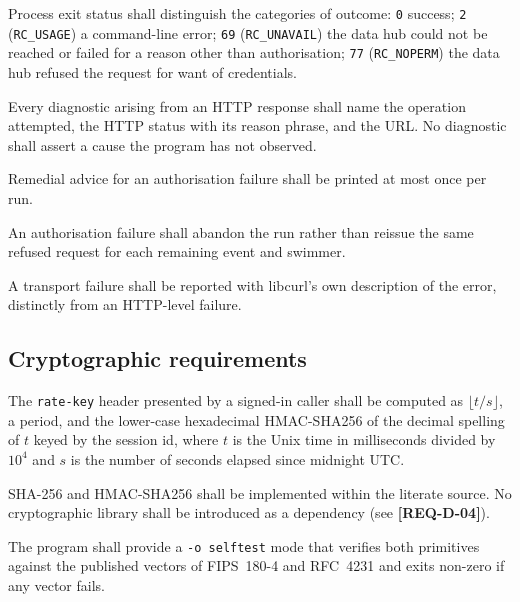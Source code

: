 \documentclass[12pt]{article}
\newcommand{\code}[1]{\texttt{#1}}
\newcommand{\req}[1]{\textbf{[#1]}}
\begin{document}
\begin{description}[style=nextline]
  \item[\req{REQ-E-01}] Process exit status shall distinguish the
        categories of outcome: \code{0} success; \code{2}
        (\code{RC\_USAGE}) a command-line error; \code{69}
        (\code{RC\_UNAVAIL}) the data hub could not be reached or
        failed for a reason other than authorisation; \code{77}
        (\code{RC\_NOPERM}) the data hub refused the request for want
        of credentials.
  \item[\req{REQ-E-02}] Every diagnostic arising from an HTTP response
        shall name the operation attempted, the HTTP status with its
        reason phrase, and the URL.  No diagnostic shall assert a cause
        the program has not observed.
  \item[\req{REQ-E-03}] Remedial advice for an authorisation failure
        shall be printed at most once per run.
  \item[\req{REQ-E-04}] An authorisation failure shall abandon the run
        rather than reissue the same refused request for each remaining
        event and swimmer.
  \item[\req{REQ-E-05}] A transport failure shall be reported with
        libcurl's own description of the error, distinctly from an
        HTTP-level failure.
\end{description}

\subsection{Cryptographic requirements}

\begin{description}[style=nextline]
  \item[\req{REQ-S-01}] The \code{rate-key} header presented by a
        signed-in caller shall be computed as
        $\lfloor t/s \rfloor$, a period, and the lower-case
        hexadecimal HMAC-SHA256 of the decimal spelling of $t$ keyed by
        the session id, where $t$ is the Unix time in milliseconds
        divided by $10^{4}$ and $s$ is the number of seconds elapsed
        since midnight UTC.
  \item[\req{REQ-S-02}] SHA-256 and HMAC-SHA256 shall be implemented
        within the literate source.  No cryptographic library shall be
        introduced as a dependency (see \req{REQ-D-04}).
  \item[\req{REQ-S-03}] The program shall provide a \code{-o selftest}
        mode that verifies both primitives against the published
        vectors of FIPS~180-4 and RFC~4231 and exits non-zero if any
        vector fails.
\end{description}
\end{document}
